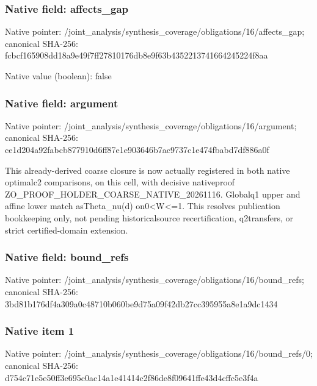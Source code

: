 \documentclass[10pt,a4paper]{article}
\begin{document}
\subsubsection{Native field: affects\_\allowbreak{}gap}
Native pointer: /joint\_\allowbreak{}analysis/synthesis\_\allowbreak{}coverage/obligations/16/affects\_\allowbreak{}gap; canonical SHA-256: fcbcf165908dd18a9e49f7ff27810176db8e9f63b4352213741664245224f8aa

Native value (boolean): false

\subsubsection{Native field: argument}
Native pointer: /joint\_\allowbreak{}analysis/synthesis\_\allowbreak{}coverage/obligations/16/argument; canonical SHA-256: ce1d204a92fabcb877910d6ff87e1e903646b7ac9737c1e474fbabd7df886a0f

\begingroup\raggedright\sloppy This already-derived coarse closure is now actually registered in both native optimalc2 comparisons,\allowbreak{} on this cell,\allowbreak{} with decisive nativeproof ZO\_\allowbreak{}PROOF\_\allowbreak{}HOLDER\_\allowbreak{}COARSE\_\allowbreak{}NATIVE\_\allowbreak{}20261116. Globalq1 upper and affine lower match asTheta\_\allowbreak{}nu(d) on0<W<=\allowbreak{}1. This resolves publication bookkeeping only,\allowbreak{} not pending historicalsource recertification,\allowbreak{} q2transfers,\allowbreak{} or strict certified-domain extension.\par\endgroup

\subsubsection{Native field: bound\_\allowbreak{}refs}
Native pointer: /joint\_\allowbreak{}analysis/synthesis\_\allowbreak{}coverage/obligations/16/bound\_\allowbreak{}refs; canonical SHA-256: 3bd81b176df4a309a0c48710b060be9d75a09f42db27cc395955a8e1a9dc1434

\subsubsection{Native item 1}
Native pointer: /joint\_\allowbreak{}analysis/synthesis\_\allowbreak{}coverage/obligations/16/bound\_\allowbreak{}refs/0; canonical SHA-256: d754c71e5e50ff3e695c0ac14a1e41414c2f86de8f09641ffe43d4cffc5e3f4a
\end{document}
